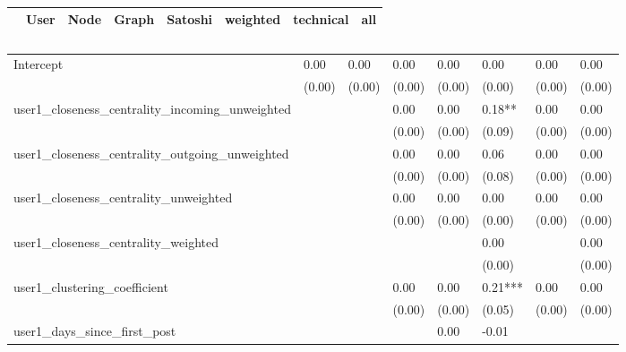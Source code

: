 \begin{table}
\caption{}
\begin{center}
\begin{tabular}{lccccccc}
\hline
                                               &   User  &   Node  &  Graph  & Satoshi & weighted & technical &   all    \\
\hline
\hline
\end{tabular}
\begin{tabular}{llllllll}
Intercept                                      & 0.00    & 0.00    & 0.00    & 0.00    & 0.00     & 0.00      & 0.00     \\
                                               & (0.00)  & (0.00)  & (0.00)  & (0.00)  & (0.00)   & (0.00)    & (0.00)   \\
user1_closeness_centrality_incoming_unweighted &         &         & 0.00    & 0.00    & 0.18**   & 0.00      & 0.00     \\
                                               &         &         & (0.00)  & (0.00)  & (0.09)   & (0.00)    & (0.00)   \\
user1_closeness_centrality_outgoing_unweighted &         &         & 0.00    & 0.00    & 0.06     & 0.00      & 0.00     \\
                                               &         &         & (0.00)  & (0.00)  & (0.08)   & (0.00)    & (0.00)   \\
user1_closeness_centrality_unweighted          &         &         & 0.00    & 0.00    & 0.00     & 0.00      & 0.00     \\
                                               &         &         & (0.00)  & (0.00)  & (0.00)   & (0.00)    & (0.00)   \\
user1_closeness_centrality_weighted            &         &         &         &         & 0.00     &           & 0.00     \\
                                               &         &         &         &         & (0.00)   &           & (0.00)   \\
user1_clustering_coefficient                   &         &         & 0.00    & 0.00    & 0.21***  & 0.00      & 0.00     \\
                                               &         &         & (0.00)  & (0.00)  & (0.05)   & (0.00)    & (0.00)   \\
user1_days_since_first_post                    &         &         &         & 0.00    & -0.01    &           &          \\

\end{tabular}
\end{center}
\end{table}
